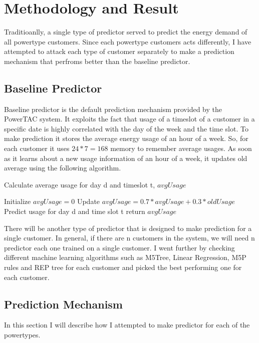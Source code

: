 
\chapter{Methodology and Result}

Traditioanlly, a single type of predictor served to predict the energy demand of all powertype customers. Since each powertype customers acts differently, I have attempted to attack each type of customer separately to make a prediction mechanism that perfroms better than the baseline predictor.

\section{Baseline Predictor}
Baseline predictor is the default prediction mechanism provided by the PowerTAC system. It exploits the fact that usage of a timeslot of a customer in a specific date is highly correlated with the day of the week and the time slot. To make prediction it stores the average energy usage of an hour of a week. So, for each customer it uses $24*7 = 168$ memory to remember average usages. As soon as it learns about a new usage information of an hour of a week, it updates old average using the following algorithm.


\begin{algorithm}
\caption{Calculate average usage for day d and timeslot t, $avgUsage$}
\begin{algorithmic} 
\STATE Initialize
\STATE $avgUsage = 0$
\STATE Update
\STATE $avgUsage = 0.7 * avgUsage + 0.3 * oldUsage$
\STATE Predict usage for day d and time slot t
\STATE return $avgUsage$
\end{algorithmic}
\end{algorithm}

There will be another type of predictor that is designed to make prediction for a single customer. In general, if there are n customers in the system, we will need n predictor each one trained on a single customer. I went further by checking different machine learning algorithms such as M5Tree, Linear Regression, M5P rules and REP tree for each customer and picked the best performing one for each customer.

\section{Prediction Mechanism}

In this section I will describe how I attempted to make predictor for each of the powertypes.

